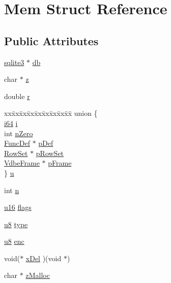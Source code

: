 \hypertarget{struct_mem}{\section{Mem Struct Reference}
\label{struct_mem}
}
\subsection*{Public Attributes}
\begin{DoxyCompactItemize}
\item 
\hyperlink{structsqlite3}{sqlite3} $\ast$ \hyperlink{struct_mem_a478da33d1e83a23931b372f9ddc706f2}{db}
\item 
char $\ast$ \hyperlink{struct_mem_a85c51a0b445063ba913693517860f5ea}{z}
\item 
double \hyperlink{struct_mem_a89ce926e95eb6d3f75344fd6525229da}{r}
\item 
\begin{tabbing}
xx\=xx\=xx\=xx\=xx\=xx\=xx\=xx\=xx\=\kill
union \{\\
\>\hyperlink{sqlite3_8c_a2a0f0f4ae7001eb54351f77ea1cdbcfd}{i64} \hyperlink{struct_mem_a48360645ba68c4fbbe651a7b7cd5764a}{i}\\
\>int \hyperlink{struct_mem_adfee686fb1c3d644b10a498e134eabc2}{nZero}\\
\>\hyperlink{struct_func_def}{FuncDef} $\ast$ \hyperlink{struct_mem_a4c16fb57d63496d4ba838ed796e24cc4}{pDef}\\
\>\hyperlink{struct_row_set}{RowSet} $\ast$ \hyperlink{struct_mem_adc33e18036e34fc08c6596d658b5e584}{pRowSet}\\
\>\hyperlink{struct_vdbe_frame}{VdbeFrame} $\ast$ \hyperlink{struct_mem_a3f903a6d1020c3c013ffb1c59b99e67f}{pFrame}\\
\} \hyperlink{struct_mem_a5fc7c7c3b04be7ea92e243be42478919}{u}\\

\end{tabbing}\item 
int \hyperlink{struct_mem_a5a613756e096c221ec68077c28424d84}{n}
\item 
\hyperlink{sqlite3_8c_a20f2299e322dcbde37cb07b16910b843}{u16} \hyperlink{struct_mem_a209bf3317161d1e33af9fe8b512f4974}{flags}
\item 
\hyperlink{sqlite3_8c_a74a0f6424ae628af25f23f0a35f6ead3}{u8} \hyperlink{struct_mem_a6756879ca1e5fa71b12db25f981b7e87}{type}
\item 
\hyperlink{sqlite3_8c_a74a0f6424ae628af25f23f0a35f6ead3}{u8} \hyperlink{struct_mem_af437c99e92b8e729b70f82fa94e96bff}{enc}
\item 
void($\ast$ \hyperlink{struct_mem_a081ea2f86933d68a8940785b62f638ef}{x\-Del} )(void $\ast$)
\item 
char $\ast$ \hyperlink{struct_mem_a68cd8f196d9dc8ab27845e1b4abbc95c}{z\-Malloc}
\end{DoxyCompactItemize}


